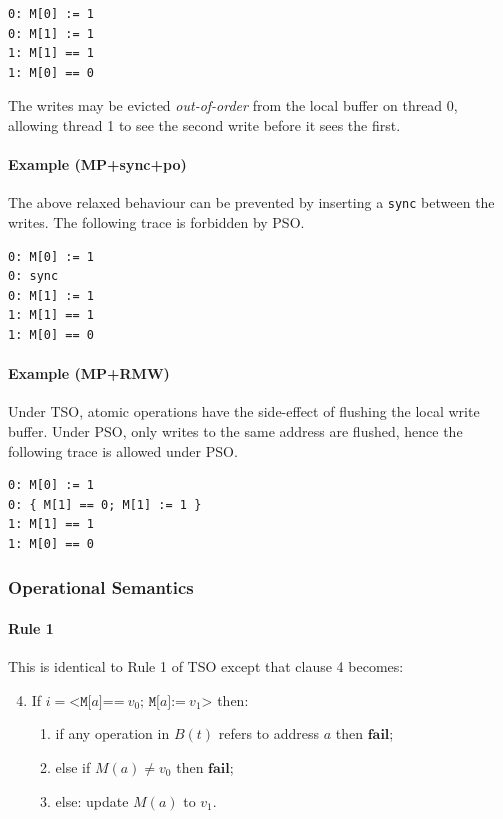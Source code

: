 \documentclass[11pt]{article}
\begin{document}
\begin{verbatim}
0: M[0] := 1
0: M[1] := 1
1: M[1] == 1
1: M[0] == 0
\end{verbatim}

\noindent The writes may be evicted \emph{out-of-order} from the local
buffer on thread 0, allowing thread 1 to see the second write before
it sees the first.

\paragraph{Example (MP+sync+po)} The above relaxed behaviour can be
prevented by inserting a \verb!sync! between the writes.  The
following trace is forbidden by PSO.

\begin{verbatim}
0: M[0] := 1
0: sync
0: M[1] := 1
1: M[1] == 1
1: M[0] == 0
\end{verbatim}

\paragraph{Example (MP+RMW)}  Under TSO, atomic operations have the
side-effect of flushing the local write buffer.  Under PSO, only
writes to the same address are flushed, hence the following trace
is allowed under PSO.

\begin{verbatim}
0: M[0] := 1
0: { M[1] == 0; M[1] := 1 }
1: M[1] == 1
1: M[0] == 0
\end{verbatim}

\subsubsection*{Operational Semantics}

\paragraph{Rule 1}

This is identical to Rule 1 of TSO except that clause 4 becomes:

\begin{enumerate}
\setcounter{enumi}{3}
\item
     If $i = \texttt{<M[}a\texttt{]==}~v_0\texttt{; M[}a\texttt{]:=}~v_1
     \texttt{>}$ then:
\begin{enumerate}[i]

\item
           if any operation in $B(t)$ refers to address $a$ then
           $\textbf{fail}$;

\item
           else if $M(a) \neq v_0$ then $\textbf{fail}$;

\item
           else: update $M(a)$ to $v_1$.
\end{enumerate}
\end{enumerate}
\end{document}
